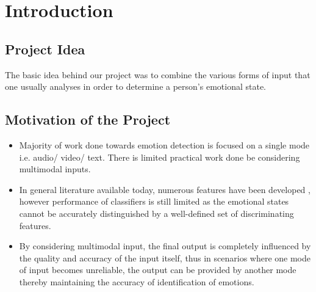 \documentclass[oneside,a4paper,12pt]{report}
\begin{document}
\begin{normalsize}
\begin{itemize}
 \end{itemize}

\chapter{Introduction}
\section{Project Idea}
 The basic idea behind our project was to combine the various forms of input that one usually analyses in order to determine a person's emotional state.

\vspace{\baselineskip}
\section{Motivation of the Project}  
\begin{itemize}
	
\item Majority of work done towards emotion detection is focused on a single mode i.e. audio/ video/ text. There is limited practical work done be considering multimodal inputs.

\item In general literature available today, numerous features have been developed , however performance of classifiers is still limited as the emotional states cannot be accurately distinguished by a well-defined set of discriminating features.

\item By considering multimodal input, the final output is completely influenced by the quality and accuracy of the input itself, thus in scenarios where one mode of input becomes unreliable, the output can be provided by another mode thereby maintaining the accuracy of identification of emotions.

\end{itemize}

\newpage


\end{normalsize}
\end{document}
